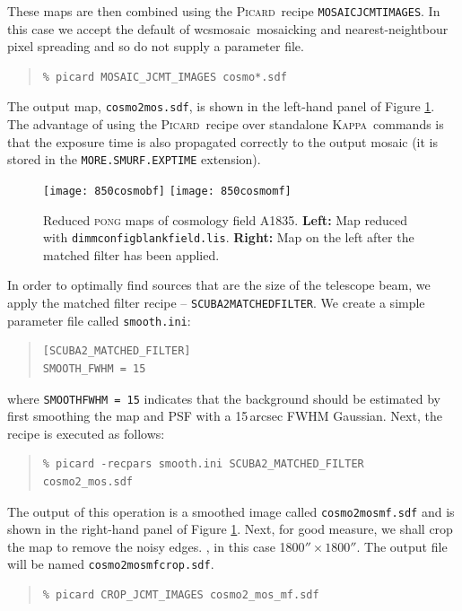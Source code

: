 \documentclass[twoside,11pt]{article}
\newcommand{\xref}[3]{#1}
\renewcommand{\_}{\texttt{\symbol{95}}}
\newenvironment{myquote}{\begin{quote}\begin{small}}{\end{small}\end{quote}}
\newcommand{\Kappa}{\xref{\textsc{Kappa}}{sun95}{}}
\newcommand{\picard}{\xref{\textsc{Picard}}{sun265}{}}
\newcommand{\drrecipe}[1]{\texttt{#1}}
\newcommand{\task}[1]{\textsf{#1}}
\newcommand{\wcsmosaic}{\xref{\task{wcsmosaic}}{sun95}{WCSMOSAIC}}
\begin{document}
These maps are then combined using the \picard\ recipe  \texttt{MOSAIC\_JCMT\_IMAGES}. In this case we accept the default of \wcsmosaic\ mosaicking and nearest-neightbour pixel spreading and so do not supply a parameter file. 
\begin{myquote}
\begin{verbatim}
% picard MOSAIC_JCMT_IMAGES cosmo*.sdf
\end{verbatim}
\end{myquote}
The output map, \texttt{cosmo2\_mos.sdf}, is shown in the left-hand panel of Figure \ref{fig:cosmomap}. The advantage of using the \picard\ recipe over standalone \Kappa\ commands is that the exposure time is also propagated correctly to the output mosaic (it is stored in the \texttt{MORE.SMURF.EXP\_TIME} extension).

\begin{figure}
\begin{center}
\texttt{[image: 850cosmo\_bf]}
\hspace{0.3cm}
\texttt{[image: 850cosmo\_mf]} \\
\caption{\small Reduced \textsc{pong} maps of cosmology field A1835. \textbf{Left:} Map reduced with \texttt{dimmconfig\_blank\_field.lis}. \textbf{Right:} Map on the left after the matched filter has been applied.}
\label{fig:cosmomap}
\end{center}
\end{figure}
 
In order to optimally find sources that are the size of the telescope beam, we apply the matched filter recipe -- \drrecipe{SCUBA2\_MATCHED\_FILTER}. We create a simple parameter file called \texttt{smooth.ini}:
\begin{myquote}
\begin{verbatim}
[SCUBA2_MATCHED_FILTER]
SMOOTH_FWHM = 15
\end{verbatim}
\end{myquote}
where \texttt{SMOOTH\_FWHM = 15} indicates that the background should be estimated by first smoothing the map and PSF with a 15\,arcsec FWHM Gaussian. Next, the recipe is executed as follows:
%
\begin{myquote}
\begin{verbatim}
% picard -recpars smooth.ini SCUBA2_MATCHED_FILTER cosmo2_mos.sdf
\end{verbatim}
\end{myquote}
%
The output of this operation is a smoothed image called \texttt{cosmo2\_mos\_mf.sdf} and is shown in the right-hand panel of Figure \ref{fig:cosmomap}.  %
Next, for good measure, we shall crop the map to remove the noisy edges. , in this case 1800$'' \times1800''$. The output file will be named \texttt{cosmo2\_mos\_mf\_crop.sdf}.
\begin{myquote}
\begin{verbatim}
% picard CROP_JCMT_IMAGES cosmo2_mos_mf.sdf
\end{verbatim}
\end{myquote}
\end{document}
